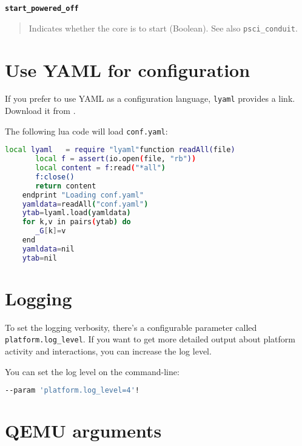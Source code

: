 {\textbf {\footnotesize{\lstinline!start_powered_off!}}}
\vspace{-2pt}
\begin{quote}
Indicates whether the core is to start (Boolean). See also {\small{\lstinline!psci_conduit!}}.
\end{quote}


\section{Use YAML for configuration}

If you prefer to use YAML as a configuration language, {\small{\lstinline!lyaml!}} provides a link. Download it from {}.

The following lua code will load {\small{\lstinline!conf.yaml!}}:

\small
\begin{lstlisting}[language=bash]
    local lyaml   = require "lyaml"function readAll(file)
       local f = assert(io.open(file, "rb"))
       local content = f:read("*all")
       f:close()
       return content
    endprint "Loading conf.yaml"
    yamldata=readAll("conf.yaml")
    ytab=lyaml.load(yamldata)
    for k,v in pairs(ytab) do
       _G[k]=v
    end
    yamldata=nil
    ytab=nil
\end{lstlisting}
\normalsize


\clearpage
\section{Logging}
\label{sec:logging}

To set the logging verbosity, there's a configurable parameter called
{\small{\lstinline!platform.log_level!}}.  If you want to get more
detailed output about platform activity and interactions, you can
increase the log level.

You can set the log level on the command-line:
\small
\begin{lstlisting}[language=bash]
    --param 'platform.log_level=4'!
\end{lstlisting}
\normalsize



\section{QEMU arguments}
\label{sec:qemuArguments}

